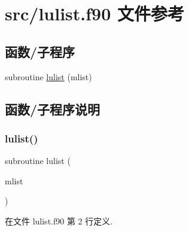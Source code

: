\hypertarget{lulist_8f90}{}\section{src/lulist.f90 文件参考}
\label{lulist_8f90}
\subsection*{函数/子程序}
\begin{DoxyCompactItemize}
\item 
subroutine \mbox{\hyperlink{lulist_8f90_ab95a54f990764c2ff10691733fcdda7d}{lulist}} (mlist)
\end{DoxyCompactItemize}


\subsection{函数/子程序说明}
\mbox{\label{lulist_8f90_ab95a54f990764c2ff10691733fcdda7d}} 
\subsubsection{\texorpdfstring{lulist()}{lulist()}}
{\footnotesize\ttfamily subroutine lulist (\begin{DoxyParamCaption}\item[{}]{mlist }\end{DoxyParamCaption})}



在文件 lulist.\+f90 第 2 行定义.

